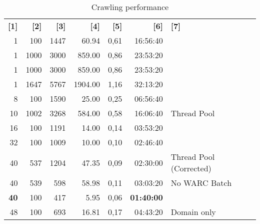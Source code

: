\begin{table}[!ht] \centering
  \caption{Crawling performance} \label{performance}
  \begin{tabular}{rrrrrrl}
    \textbf{[1]} & \textbf{[2]} & \textbf{[3]} & \textbf{[4]} & \textbf{[5]} & \textbf{[6]}      & \textbf{[7]}             \\
    1            & 100          & 1447         & 60.94        & 0,61         & 16:56:40          &                          \\
    1            & 1000         & 3000         & 859.00       & 0,86         & 23:53:20          &                          \\
    1            & 1000         & 3000         & 859.00       & 0,86         & 23:53:20          &                          \\
    1            & 1647         & 5767         & 1904.00      & 1,16         & 32:13:20          &                          \\
    8            & 100          & 1590         & 25.00        & 0,25         & 06:56:40          &                          \\
    10           & 1002         & 3268         & 584.00       & 0,58         & 16:06:40          & Thread Pool              \\
    16           & 100          & 1191         & 14.00        & 0,14         & 03:53:20          &                          \\
    32           & 100          & 1009         & 10.00        & 0,10         & 02:46:40          &                          \\
    40           & 537          & 1204         & 47.35        & 0,09         & 02:30:00          & Thread Pool (Corrected)  \\
    40           & 539          & 598          & 58.98        & 0,11         & 03:03:20          & No WARC Batch            \\
    \textbf{40}  & 100          & 417          & 5.95         & 0,06         & \textbf{01:40:00} &                          \\
    48           & 100          & 693          & 16.81        & 0,17         & 04:43:20          & Domain only              \\

\end{tabular}
\end{table}
